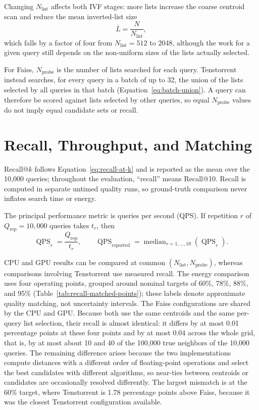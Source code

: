 Changing \(N_{\mathrm{list}}\) affects both IVF stages: more lists increase the
coarse centroid scan and reduce the mean inverted-list size
\begin{equation}
\overline{L}=\frac{N}{N_{\mathrm{list}}},
\label{eq:mean-list-size}
\end{equation}
which falls by a factor of four from \(N_{\mathrm{list}}=512\) to 2048, although
the work for a given query still depends on the non-uniform sizes of the lists
actually selected.

For Faiss, \(N_{\mathrm{probe}}\) is the number of lists searched for each
query. Tenstorrent instead searches, for every query in a batch of up to 32, the
union of the lists selected by all queries in that batch
(Equation~\ref{eq:batch-union}). A query can therefore be scored against lists
selected by other queries, so equal \(N_{\mathrm{probe}}\) values do not imply
equal candidate sets or recall.

\section{Recall, Throughput, and Matching}
\label{sec:evaluation-metrics}

Recall@\(k\) follows Equation~\ref{eq:recall-at-k} and is reported as the mean
over the 10,000 queries; throughout the evaluation, ``recall'' means Recall@10.
Recall is computed in separate untimed quality runs, so ground-truth
comparison never inflates search time or energy.

The principal performance metric is queries per second (QPS). If repetition
\(r\) of \(Q_{\mathrm{rep}}=10{,}000\) queries takes \(t_r\), then
\begin{equation}
\operatorname{QPS}_r=\frac{Q_{\mathrm{rep}}}{t_r},
\qquad
\operatorname{QPS}_{\mathrm{reported}}
=\operatorname{median}_{r=1,\ldots,10}\left(\operatorname{QPS}_r\right).
\label{eq:median-qps}
\end{equation}

CPU and GPU results can be compared at common
\((N_{\mathrm{list}},N_{\mathrm{probe}})\), whereas comparisons involving
Tenstorrent use measured recall. The energy comparison uses four operating
points, grouped around nominal targets of 60\%, 78\%, 88\%, and 95\%
(Table~\ref{tab:recall-matched-points}); these labels denote approximate
quality matching, not uncertainty intervals. The Faiss configurations are
shared by the CPU and GPU. Because both use the same centroids and the same
per-query list selection, their recall is almost identical: it differs by at
most 0.01 percentage points at these four points and by at most 0.04 across
the whole grid, that is, by at most about 10 and 40 of the 100,000 true
neighbors of the 10,000 queries. The remaining difference arises because the
two implementations compute distances with a different order of
floating-point operations and select the best candidates with different
algorithms, so near-ties between centroids or candidates are occasionally
resolved differently. The
largest mismatch is at the 60\% target, where Tenstorrent is 1.78 percentage
points above Faiss, because it was the closest Tenstorrent configuration available.

